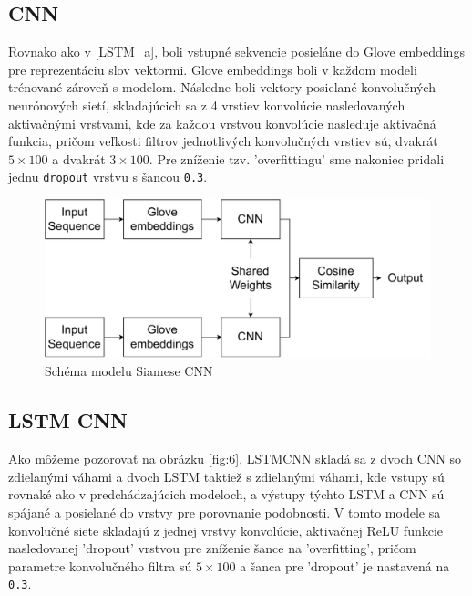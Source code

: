 \documentclass[a4paper, 16pt]{article}
\begin{document}
\subsection{CNN}
\label{CNN_a}
Rovnako ako v \ref{LSTM_a}, boli vstupné sekvencie posieláne do Glove embeddings pre reprezentáciu slov vektormi. Glove embeddings boli v každom modeli trénované zároveň s modelom. Následne boli vektory posielané konvolučných neurónových sietí, skladajúcich sa z 4 vrstiev konvolúcie nasledovaných aktivačnými vrstvami, kde za každou vrstvou konvolúcie nasleduje aktivačná funkcia, pričom veľkosti filtrov jednotlivých konvolučných vrstiev sú, dvakrát  $5 \times 100$ a dvakrát $3 \times 100$. Pre zníženie tzv. 'overfittingu' sme nakoniec pridali jednu \texttt{dropout} vrstvu s šancou \texttt{0.3}.
\begin{figure}[H]
    \centering
    \includegraphics[width=15cm]{imgs/CNN.pdf}
    \caption{Schéma modelu Siamese CNN}
    \label{fig:5}
\end{figure}

\subsection{LSTM CNN}
\label{LSTMCNN_a}
Ako môžeme pozorovať na obrázku \ref{fig:6}, LSTMCNN skladá sa z dvoch CNN so zdielanými váhami a dvoch LSTM taktiež s zdielanými váhami, kde vstupy sú rovnaké ako v predchádzajúcich modeloch, a výstupy týchto LSTM a CNN sú spájané a posielané do vrstvy pre porovnanie podobnosti. V tomto modele sa konvolučné siete skladajú z jednej vrstvy konvolúcie, aktivačnej ReLU funkcie nasledovanej 'dropout' vrstvou pre zníženie šance na 'overfitting', pričom parametre konvolučného filtra sú $5 \times 100$ a šanca pre 'dropout' je nastavená na \texttt{0.3}.
\end{document}
